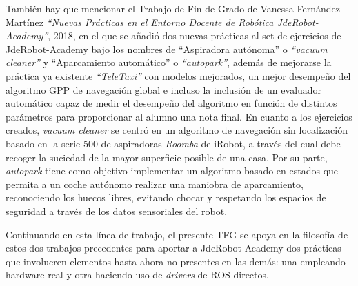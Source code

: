 También hay que mencionar el Trabajo de Fin de Grado de Vanessa Fernández Martínez \textit{“Nuevas Prácticas en el Entorno Docente de Robótica JdeRobot-Academy”}, 2018, en el que se añadió dos nuevas prácticas al set de ejercicios de JdeRobot-Academy bajo los nombres de “Aspiradora autónoma” o \textit{“vacuum cleaner”} y “Aparcamiento automático” o \textit{“autopark”}, además de mejorarse la práctica ya existente \textit{“TeleTaxi”} con modelos mejorados, un mejor desempeño del algoritmo GPP de navegación global e incluso la inclusión de un evaluador automático capaz de medir el desempeño del algoritmo en función de distintos parámetros para proporcionar al alumno una nota final. En cuanto a los ejercicios creados, \textit{vacuum cleaner} se centró en un algoritmo de navegación sin localización basado en la serie 500 de aspiradoras \textit{Roomba} de iRobot, a través del cual debe recoger la suciedad de la mayor superficie posible de una casa. Por su parte, \textit{autopark} tiene como objetivo implementar un algoritmo basado en estados que permita a un coche autónomo realizar una maniobra de aparcamiento, reconociendo los huecos libres, evitando chocar y respetando los espacios de seguridad a través de los datos sensoriales del robot.

Continuando en esta línea de trabajo, el presente TFG se apoya en la filosofía de estos dos trabajos precedentes para aportar a JdeRobot-Academy dos prácticas que involucren elementos hasta ahora no presentes en las demás: una empleando hardware real y otra haciendo uso de \textit{drivers} de ROS directos.